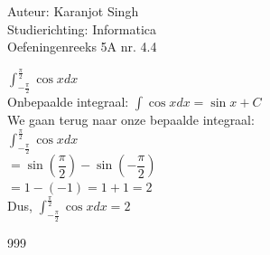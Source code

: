 \documentclass[a4paper]{article}
\begin{document}
\noindent \large Auteur: Karanjot Singh \\
\noindent \large Studierichting: Informatica \\
\noindent \large Oefeningenreeks 5A nr. 4.4 \\

\normalsize

$\displaystyle\int_{-\tfrac{\pi}{2}}^{\tfrac{\pi}{2}} \cos x dx$ \\

Onbepaalde integraal: $\displaystyle\int \cos x dx = \sin x + C$ \\

We gaan terug naar onze bepaalde integraal: \\

$\displaystyle\int_{-\tfrac{\pi}{2}}^{\tfrac{\pi}{2}} \cos x dx$ \\

$= \sin\left(\dfrac{\pi}{2}\right) - \sin\left(-\dfrac{\pi}{2}\right)$ \\

$= 1 - (-1) = 1 + 1 = 2$ \\

Dus, $\displaystyle\int_{-\tfrac{\pi}{2}}^{\tfrac{\pi}{2}} \cos x dx = 2$ \\

\begin{thebibliography}{999}
\end{thebibliography}
\end{document}
